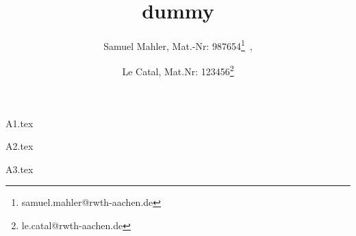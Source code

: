 \documentclass[12pt,a4paper]{scrartcl}
\author{Samuel Mahler, Mat.-Nr: 987654\thanks{samuel.mahler@rwth-aachen.de}\ ,
		\and Le Catal, Mat.Nr: 123456\thanks{le.catal@rwth-aachen.de}}
\title{dummy}
\begin{document}
\parindent0cm

\maketitle

\newpage


{A1.tex}


{A2.tex}


{A3.tex}




\end{document}
